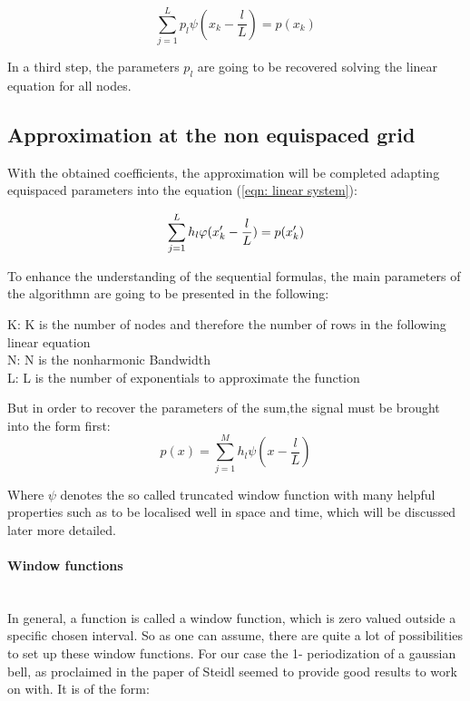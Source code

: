 \documentclass[11pt]{report} %
\begin{document}
\begin{equation}
\sum\limits_{j=1}^L p_{l}\psi(x_{k}-\frac{l}{L})=p(x_{k})\label{eqn: linear system}
\end{equation}


In a third step, the parameters $p_l$ are going to be recovered solving the linear equation for all nodes.

\subsection{Approximation at the non equispaced grid}
With the obtained coefficients, the approximation will be completed adapting equispaced parameters into the equation (\eqref{eqn: linear system}): 

\begin{equation}
 \sum\limits_{j=1}^L h_{l}\varphi(x'_{k}-\frac{l}{L})=p(x'_{k})\notag
\end{equation}


 



To enhance the understanding of the sequential formulas, the main parameters of the algorithmn are going to be presented in the following:

 K: K is the number of nodes and therefore the number of rows in the following linear equation\\
 N: N is the nonharmonic Bandwidth\\
 L: L is the number of exponentials to approximate the function


But in order to recover the parameters of the sum,the signal must be brought into the form first:  
\begin{equation}\label{eqn:truncatedw}
 p(x)=\sum\limits_{j=1}^M h_{l}\psi(x-\frac{l}{L})
\end{equation}

Where $\psi$ denotes the so called truncated window function with many helpful properties such as to be localised well in space and time, which will be discussed later more detailed. \\

\paragraph{Window functions	} $ $\\[1ex]
In general, a function is called a window function, which is zero valued outside a specific chosen interval.
So as one can assume, there are quite a lot of possibilities to set up these window functions.
For our case the 1- periodization of a gaussian bell, as proclaimed in the paper of Steidl seemed to provide good results to work on with.
It is of the form: 
\end{document}
